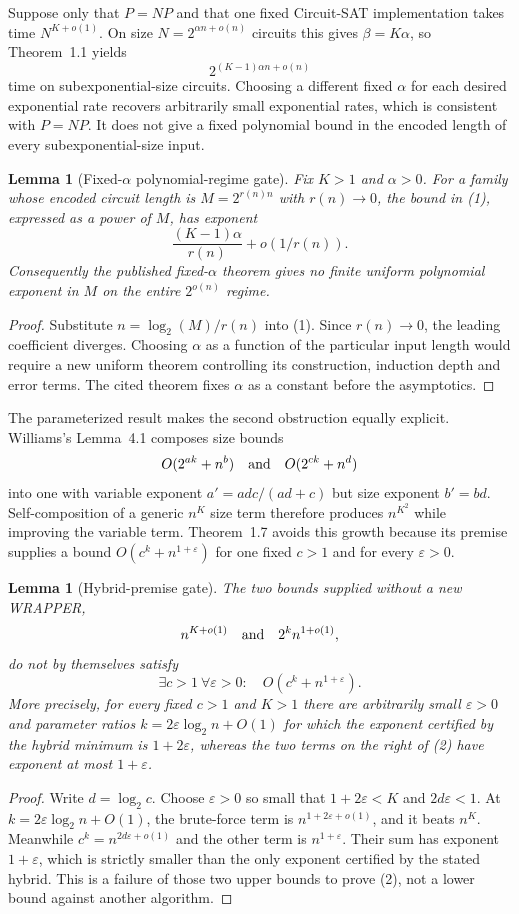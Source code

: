 \documentclass[11pt]{article}
\newtheorem{lemma}[theorem]{Lemma}
\begin{document}
Suppose only that $P=NP$ and that one fixed Circuit-SAT implementation takes
time $N^{K+o(1)}$.  On size $N=2^{\alpha n+o(n)}$ circuits this gives
$\beta=K\alpha$, so Theorem~1.1 yields
\[
 2^{(K-1)\alpha n+o(n)}
\tag{1}
\]
time on subexponential-size circuits.  Choosing a different fixed $\alpha$
for each desired exponential rate recovers arbitrarily small exponential
rates, which is consistent with $P=NP$.  It does not give a fixed polynomial
bound in the encoded length of every subexponential-size input.

\begin{lemma}[Fixed-$\alpha$ polynomial-regime gate]
Fix $K>1$ and $\alpha>0$.  For a family whose encoded circuit length is
$M=2^{r(n)n}$ with $r(n)\to0$, the bound in (1), expressed as a power of $M$,
has exponent
\[
 \frac{(K-1)\alpha}{r(n)}+o(1/r(n)).
\]
Consequently the published fixed-$\alpha$ theorem gives no finite uniform
polynomial exponent in $M$ on the entire $2^{o(n)}$ regime.
\end{lemma}
\begin{proof}
Substitute $n=\log_2(M)/r(n)$ into (1).  Since $r(n)\to0$, the leading
coefficient diverges.  Choosing $\alpha$ as a function of the particular
input length would require a new uniform theorem controlling its construction,
induction depth and error terms.  The cited theorem fixes $\alpha$ as a
constant before the asymptotics.
\end{proof}

The parameterized result makes the second obstruction equally explicit.
Williams's Lemma~4.1 composes size bounds
\[
 O(2^{ak}+n^b)\quad\hbox{and}\quad O(2^{ck}+n^d)
\]
into one with variable exponent $a'=adc/(ad+c)$ but size exponent
$b'=bd$.  Self-composition of a generic $n^K$ size term therefore produces
$n^{K^2}$ while improving the variable term.  Theorem~1.7 avoids this growth
because its premise supplies a bound $O(c^k+n^{1+\varepsilon})$ for one fixed
$c>1$ and for every $\varepsilon>0$.

\begin{lemma}[Hybrid-premise gate]
The two bounds supplied without a new WRAPPER,
\[
 n^{K+o(1)}\quad\hbox{and}\quad 2^k n^{1+o(1)},
\]
do not by themselves satisfy
\[
 \exists c>1\ \forall\varepsilon>0:\quad
 O(c^k+n^{1+\varepsilon}).
\tag{2}
\]
More precisely, for every fixed $c>1$ and $K>1$ there are arbitrarily small
$\varepsilon>0$ and parameter ratios $k=2\varepsilon\log_2n+O(1)$ for which
the exponent certified by the hybrid minimum is $1+2\varepsilon$, whereas
the two terms on the right of (2) have exponent at most $1+\varepsilon$.
\end{lemma}
\begin{proof}
Write $d=\log_2c$.  Choose $\varepsilon>0$ so small that
$1+2\varepsilon<K$ and $2d\varepsilon<1$.  At
$k=2\varepsilon\log_2n+O(1)$, the brute-force term is
$n^{1+2\varepsilon+o(1)}$, and it beats $n^K$.  Meanwhile
$c^k=n^{2d\varepsilon+o(1)}$ and the other term is
$n^{1+\varepsilon}$.  Their sum has exponent $1+\varepsilon$, which is
strictly smaller than the only exponent certified by the stated hybrid.
This is a failure of those two upper bounds to prove (2), not a lower bound
against another algorithm.
\end{proof}
\end{document}
